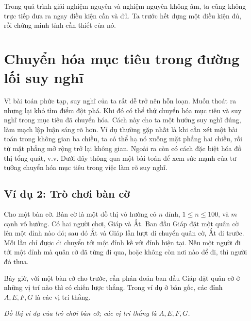 \documentclass[11pt]{article}
\begin{document}
Trong quá trình giải nghiệm nguyên và nghiệm nguyên không âm, ta cũng không
trực tiếp đưa ra ngay điều kiện cần và đủ. Ta trước hết dựng một điều kiện đủ,
rồi chứng minh tính cần thiết của nó.

\section{Chuyển hóa mục tiêu trong đường lối suy nghĩ}

Vì bài toán phức tạp, suy nghĩ của ta rất dễ trở nên hỗn loạn. Muốn thoát ra
nhưng lại khó tìm điểm đột phá. Khi đó có thể thử chuyển hóa mục tiêu và suy
nghĩ trong mục tiêu đã chuyển hóa. Cách này cho ta một hướng suy nghĩ đúng,
làm mạch lập luận sáng rõ hơn. Ví dụ thường gặp nhất là khi cần xét một bài
toán trong không gian ba chiều, ta có thể hạ nó xuống mặt phẳng hai chiều, rồi
từ mặt phẳng mở rộng trở lại không gian. Ngoài ra còn có cách đặc biệt hóa đồ
thị tổng quát, v.v. Dưới đây thông qua một bài toán để xem sức mạnh của tư
tưởng chuyển hóa mục tiêu trong việc làm rõ suy nghĩ.

\subsection*{Ví dụ 2: Trò chơi bàn cờ}

Cho một bàn cờ. Bàn cờ là một đồ thị vô hướng có \(n\) đỉnh,
\(1\le n\le 100\), và \(m\) cạnh vô hướng. Có hai người chơi, Giáp và Ất. Ban
đầu Giáp đặt một quân cờ lên một đỉnh nào đó; sau đó Ất và Giáp lần lượt di
chuyển quân cờ, Ất đi trước. Mỗi lần chỉ được di chuyển tới một đỉnh kề với
đỉnh hiện tại. Nếu một người đi tới một đỉnh mà quân cờ đã từng đi qua, hoặc
không còn nơi nào để đi, thì người đó thua.

Bây giờ, với một bàn cờ cho trước, cần phán đoán ban đầu Giáp đặt quân cờ ở
những vị trí nào thì có chiến lược thắng. Trong ví dụ ở bản gốc, các đỉnh
\(A,E,F,G\) là các vị trí thắng.

\begin{center}

\smallskip
\textit{Đồ thị ví dụ của trò chơi bàn cờ; các vị trí thắng là \(A,E,F,G\).}
\end{center}
\end{document}
